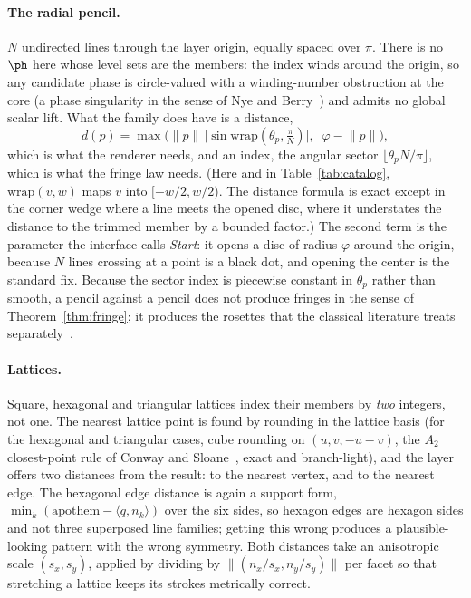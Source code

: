 \paragraph{The radial pencil.} $N$ undirected lines through the layer origin,
equally spaced over $\pi$. There is no $\ph$ here whose level sets are the members:
the index winds around the origin, so any candidate phase is circle-valued with
a winding-number obstruction at the core (a phase singularity in the sense of
Nye and Berry~\cite{Nye1974Dislocations}) and admits no global scalar lift.
What the family does have is a distance,
\begin{equation}
  d(p)=\max\!\Big(\lVert p\rVert\,\big\lvert\sin\mathrm{wrap}(\theta_p,\tfrac{\pi}{N})\big\rvert,
  \;\; \varphi-\lVert p\rVert\Big),
  \label{eq:radial}
\end{equation}
which is what the renderer needs, and an index, the angular sector
$\lfloor \theta_p N/\pi\rfloor$, which is what the fringe law needs. (Here
and in Table~\ref{tab:catalog}, $\mathrm{wrap}(v,w)$ maps $v$ into
$[-w/2,w/2)$. The distance formula is exact except in the corner wedge where
a line meets the opened disc, where it understates the distance to the
trimmed member by a bounded factor.) The second
term is the parameter the interface calls \emph{Start}: it opens a disc of radius
$\varphi$ around the origin, because $N$ lines crossing at a point is a black dot,
and opening the center is the standard fix. Because the sector index is piecewise
constant in $\theta_p$ rather than smooth, a pencil against a pencil does not
produce fringes in the sense of Theorem~\ref{thm:fringe}; it produces the rosettes
that the classical literature treats separately~\cite{Amidror2009Theory}.

\paragraph{Lattices.} Square, hexagonal and triangular lattices index their
members by \emph{two} integers, not one. The nearest lattice point is found by
rounding in the lattice basis (for the hexagonal and triangular cases, cube
rounding on $(u,v,-u-v)$, the $A_2$ closest-point rule of Conway and
Sloane~\cite{Conway1982Fast}, exact and branch-light), and the layer offers
two distances from the result: to the nearest vertex, and to the nearest edge. The
hexagonal edge distance is again a support form, $\min_k(\mathrm{apothem}-\langle
q,n_k\rangle)$ over the six sides, so hexagon edges are hexagon sides and not
three superposed line families; getting this wrong produces a plausible-looking
pattern with the wrong symmetry. Both distances take an anisotropic scale
$(s_x,s_y)$, applied by dividing by $\lVert(n_x/s_x,n_y/s_y)\rVert$ per facet so
that stretching a lattice keeps its strokes metrically correct.

